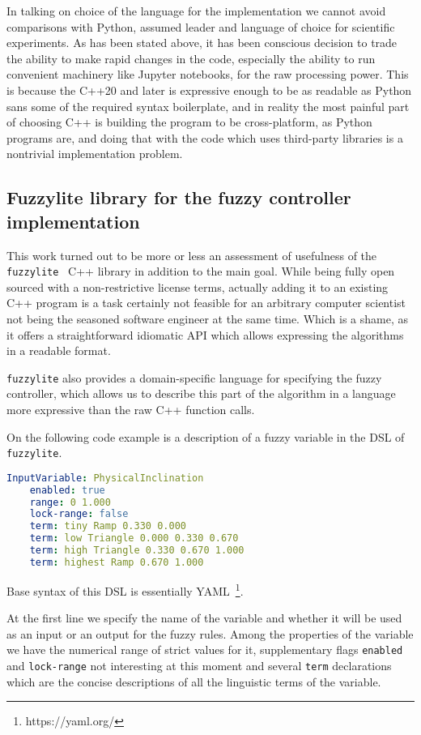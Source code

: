 \documentclass[11pt, a4paper]{article}
\begin{document}
	In talking on choice of the language for the implementation we cannot avoid comparisons with Python, assumed leader and language of choice for scientific experiments.
	As has been stated above, it has been conscious decision to trade the ability to make rapid changes in the code, especially the ability to run convenient machinery like Jupyter notebooks, for the raw processing power.
	This is because the C++20 and later is expressive enough to be as readable as Python sans some of the required syntax boilerplate, and in reality the most painful part of choosing C++ is building the program to be cross-platform, as Python programs are, and doing that with the code which uses third-party libraries is a nontrivial implementation problem.

	\subsection{Fuzzylite library for the fuzzy controller implementation}\label{fuzzy-implementation}

	This work turned out to be more or less an assessment of usefulness of the \texttt{fuzzylite}~\cite{fl::fuzzylite} C++ library in addition to the main goal.
	While being fully open sourced with a non-restrictive license terms, actually adding it to an existing C++ program is a task certainly not feasible for an arbitrary computer scientist not being the seasoned software engineer at the same time.
	Which is a shame, as it offers a straightforward idiomatic API which allows expressing the algorithms in a readable format.

	\texttt{fuzzylite} also provides a domain-specific language for specifying the fuzzy controller, which allows us to describe this part of the algorithm in a language more expressive than the raw C++ function calls.

  On the following code example is a description of a fuzzy variable in the DSL of \texttt{fuzzylite}.

  \begin{lstlisting}[language=yaml]
  InputVariable: PhysicalInclination
    enabled: true
    range: 0 1.000
    lock-range: false
    term: tiny Ramp 0.330 0.000
    term: low Triangle 0.000 0.330 0.670
    term: high Triangle 0.330 0.670 1.000
    term: highest Ramp 0.670 1.000
  \end{lstlisting}

  Base syntax of this DSL is essentially YAML~\footnote{https://yaml.org/}.

  At the first line we specify the name of the variable and whether it will be used as an input or an output for the fuzzy rules.
  Among the properties of the variable we have the numerical range of strict values for it, supplementary flags \texttt{enabled} and \texttt{lock-range} not interesting at this moment
  and several \texttt{term} declarations which are the concise descriptions of all the linguistic terms of the variable.
\end{document}
